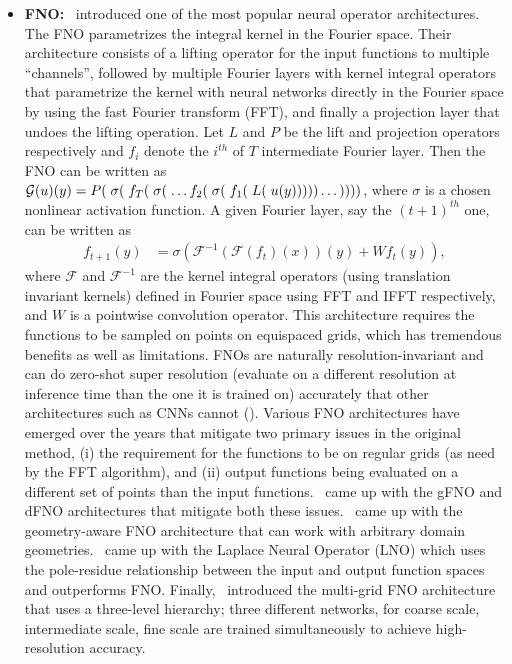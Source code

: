 \begin{itemize}
\item {\bf FNO:}~\citep{li2020fourier} introduced one of the most popular neural operator architectures. The FNO parametrizes the integral kernel in the Fourier space. Their architecture consists of a lifting operator for the input functions to multiple ``channels'', followed by multiple Fourier layers with kernel integral operators that parametrize the kernel with neural networks directly in the Fourier space by using the fast Fourier transform (FFT), and finally a projection layer that undoes the lifting operation. Let $L$ and $P$ be the lift and projection operators respectively and $f_i$ denote the $i^{th}$ of $T$ intermediate Fourier layer. Then the FNO can be written as $\mathcal{G}(u)(y) = P(\; \sigma(\; f_T(\; \sigma(\; \dots f_2(\; \sigma(\; f_1(\; L(\; u(y))))) \dots ))))$, where $\sigma$ is a chosen nonlinear activation function. A given Fourier layer, say the $(t+1)^{th}$ one, can be written as
\begin{align}
f_{t+1}(y) &= \sigma\left(\mathcal{F}^{-1}\left( \mathcal{F}(f_t)(x) \right)(y) +  W f_t(y) \right),
\end{align}
where $\mathcal{F}$ and $\mathcal{F}^{-1}$ are the kernel integral operators (using translation invariant kernels) defined in Fourier space using FFT and IFFT respectively, and $W$ is a pointwise convolution operator. This architecture requires the functions to be sampled on points on equispaced grids, which has tremendous benefits as well as limitations. FNOs are naturally resolution-invariant and can do zero-shot super resolution (evaluate on a different resolution at inference time than the one it is trained on) accurately that other architectures such as CNNs cannot (\citep[Section 4]{li2020fourier}). Various FNO architectures have emerged over the years that mitigate two primary issues in the original method, (i) the requirement for the functions to be on regular grids (as need by the FFT algorithm), and (ii) output functions being evaluated on a different set of points than the input functions.~\citep{lu2022comprehensive} came up with the gFNO and dFNO architectures that mitigate both these issues.~\citep{li2023fourier} came up with the geometry-aware FNO architecture that can work with arbitrary domain geometries.~\citep{cao2024laplace} came up with the Laplace Neural Operator (LNO) which uses the pole-residue relationship between the input and output function spaces and outperforms FNO. Finally,~\citep{guo2024mgfno} introduced the multi-grid FNO architecture that uses a three-level hierarchy; three different networks, for coarse scale, intermediate scale, fine scale are trained simultaneously to achieve high-resolution accuracy.


\end{itemize}
